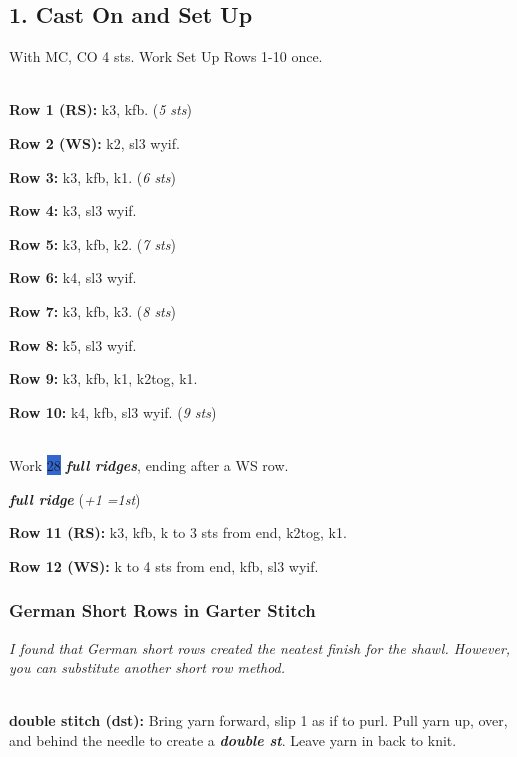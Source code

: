 \documentclass[12pt]{article}
\newcommand{\vocab}[1]{\emph{\textbf{#1}}} %
\newcommand{\rowDir}[1]{\textbf{#1:}} %
\newcommand{\highlighted}[1]{\colorbox{highlight}{#1}} %
\newcommand{\increase}[1]{(\emph{+#1 
	\ifnum#1=1{st}\else{sts}\fi})}
\newcommand{\stitchcount}[1]{(\emph{#1 sts})}
\newenvironment{frnote}
    {%
    	\def\FrameCommand{\fboxrule=\FrameRule\fboxsep=\FrameSep \fcolorbox{framecolor}{shadecolor}}
    	\MakeFramed {\advance\hsize-\width\FrameRestore}}
    {\endMakeFramed}
\begin{document}
\begin{multicols}{2} \normalsize
\section*{1. Cast On and Set Up}

With MC, CO 4 sts. Work Set Up Rows 1-10 once.

~\\
\rowDir{Row 1 (RS)} k3, kfb. \stitchcount{5}

\rowDir{Row 2 (WS)} k2, sl3 wyif.

\rowDir{Row 3} k3, kfb, k1. \stitchcount{6}

\rowDir{Row 4} k3, sl3 wyif.

\rowDir{Row 5} k3, kfb, k2. \stitchcount{7}

\rowDir{Row 6} k4, sl3 wyif.

\rowDir{Row 7} k3, kfb, k3. \stitchcount{8}

\rowDir{Row 8} k5, sl3 wyif.

\rowDir{Row 9} k3, kfb, k1, k2tog, k1.

\rowDir{Row 10} k4, kfb, sl3 wyif. \stitchcount{9}

~\\
Work \highlighted{28} \vocab{full ridges}, ending after a WS row.

\begin{framed}
\vocab{full ridge} \increase{1} \vspace{0.5em}

\rowDir{Row 11 (RS)} k3, kfb, k to 3 sts from end, k2tog, k1.

\rowDir{Row 12 (WS)} k to 4 sts from end, kfb, sl3 wyif.
\end{framed}

\begin{frnote} \vspace{-1em}
\subsubsection*{German Short Rows in Garter Stitch}

\emph{I found that German short rows created the neatest finish for the shawl. However, you can substitute another short row method.}

~\\
\rowDir{double stitch (dst)}
Bring yarn forward, slip 1 as if to purl. Pull yarn up, over, and behind the needle to create a \vocab{double st}. Leave yarn in back to knit.


\end{frnote}
\end{multicols}
\end{document}
